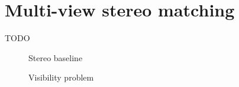 \section{Multi-view stereo matching}

TODO

\begin{figure}[ht]
    \centering
    \caption{Stereo baseline}
    \label{fig:stereo-baseline}
\end{figure}

\begin{figure}[ht]
    \centering
    \caption{Visibility problem}
    \label{fig:visibility-problem}
\end{figure}
